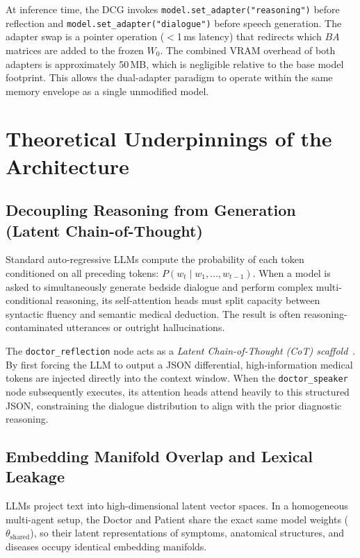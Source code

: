 At inference time, the DCG invokes \texttt{model.set\_adapter("reasoning")} before reflection and \texttt{model.set\_adapter("dialogue")} before speech generation. The adapter swap is a pointer operation ($<$1\,ms latency) that redirects which $BA$ matrices are added to the frozen $W_0$. The combined VRAM overhead of both adapters is approximately 50\,MB, which is negligible relative to the base model footprint. This allows the dual-adapter paradigm to operate within the same memory envelope as a single unmodified model.

\section{Theoretical Underpinnings of the Architecture}

\subsection{Decoupling Reasoning from Generation (Latent Chain-of-Thought)}

Standard auto-regressive LLMs compute the probability of each token conditioned on all preceding tokens: $P(w_t \mid w_1, \ldots, w_{t-1})$. When a model is asked to simultaneously generate bedside dialogue and perform complex multi-conditional reasoning, its self-attention heads must split capacity between syntactic fluency and semantic medical deduction. The result is often reasoning-contaminated utterances or outright hallucinations.

The \texttt{doctor\_reflection} node acts as a \textit{Latent Chain-of-Thought (CoT) scaffold}~\cite{wang2024survey}. By first forcing the LLM to output a JSON differential, high-information medical tokens are injected directly into the context window. When the \texttt{doctor\_speaker} node subsequently executes, its attention heads attend heavily to this structured JSON, constraining the dialogue distribution to align with the prior diagnostic reasoning.

\subsection{Embedding Manifold Overlap and Lexical Leakage}

LLMs project text into high-dimensional latent vector spaces. In a homogeneous multi-agent setup, the Doctor and Patient share the exact same model weights ($\theta_{\text{shared}}$), so their latent representations of symptoms, anatomical structures, and diseases occupy identical embedding manifolds.

